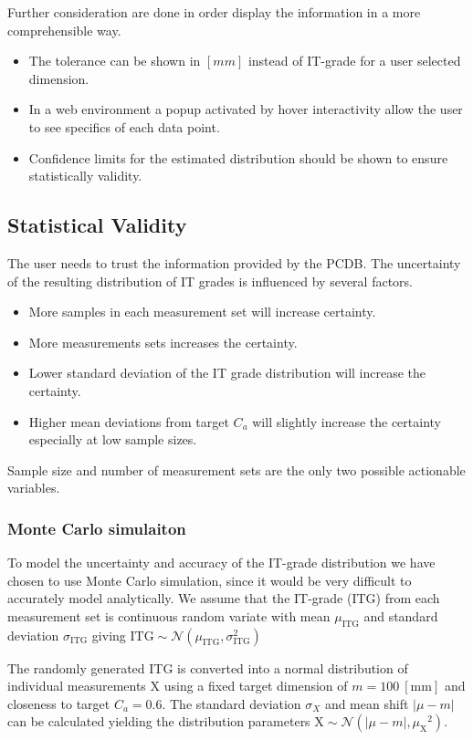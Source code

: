 \documentclass[aip,amsmath, preprint, author-year]{revtex4-1}
\begin{document}
Further consideration are done in order display the information in a more comprehensible way.
\begin{itemize}
\item The tolerance can be shown in $[mm]$ instead of IT-grade for a user selected dimension.
\item In a web environment a popup activated by hover interactivity allow the user to see specifics of each data point.
\item Confidence limits for the estimated distribution should be shown to ensure statistically validity.
\end{itemize}

\subsection{Statistical Validity}
The user needs to trust the information provided by the PCDB. 
The uncertainty of the resulting distribution of IT grades is influenced by several factors.
\begin{itemize}
\item More samples in each measurement set will increase certainty. 
\item More measurements sets increases the certainty. 
\item Lower standard deviation of the IT grade distribution will increase the certainty.
\item Higher mean deviations from target $C_a$ will slightly increase the certainty especially at low sample sizes.
\end{itemize}
Sample size and number of measurement sets are the only two possible actionable variables. 

\subsubsection{Monte Carlo simulaiton}
To model the uncertainty and accuracy of the IT-grade distribution we have chosen to use Monte Carlo simulation, since it would be very difficult to accurately model analytically. 
We assume that the IT-grade (ITG) from each measurement set is continuous random variate with mean $\mu_{\mathrm{ITG}}$ and standard deviation $\sigma_{\mathrm{ITG}}$ giving $\mathrm{ITG} \sim \mathcal{N} (\mu_{\mathrm{ITG}}, \sigma_{\mathrm{ITG}}^2)$

The randomly generated ITG is converted into a normal distribution of individual measurements X using a fixed target dimension of $m = 100 \mathrm{\ [mm]}$ and closeness to target $C_a = 0.6$. 
The standard deviation $\sigma_{X}$ and mean shift $| \mu - m|$ can be calculated yielding the distribution parameters $\mathrm{X} \sim \mathcal{N} (| \mu - m|, {\mu_{\mathrm{X}}}^2)$. 
\end{document}
